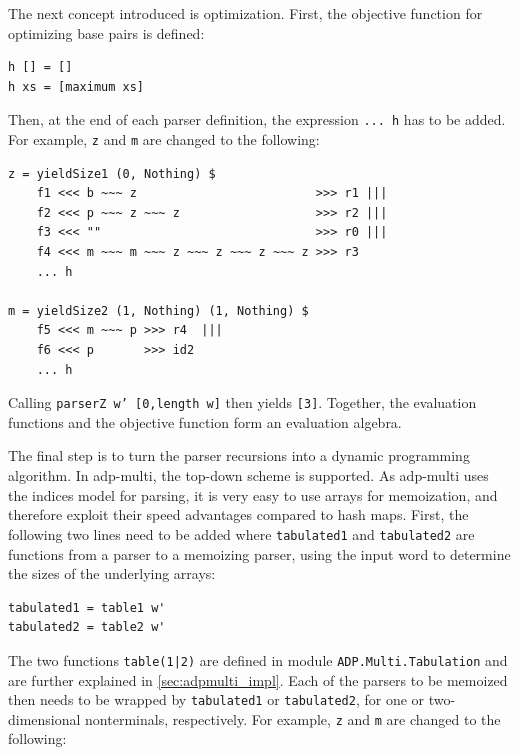 \documentclass[
    a4paper,
    12pt,
    twoside,
    BCOR=12mm,
    parskip=half,
    chapterprefix,
    numbers=noenddot,
    bibliography=totoc
]{scrbook}
\begin{document}
The next concept introduced is optimization. First, the objective function for optimizing base pairs is defined:

\begin{lstlisting}[caption=Objective function for maximizing base pairs]
h [] = []
h xs = [maximum xs]
\end{lstlisting}

Then, at the end of each parser definition, the expression \texttt{... h} has to be added. For example, \texttt{z} and \texttt{m} are changed to the following:

\begin{lstlisting}[caption=Application of objective function \texttt{h}]
z = yieldSize1 (0, Nothing) $
    f1 <<< b ~~~ z                         >>> r1 |||
    f2 <<< p ~~~ z ~~~ z                   >>> r2 |||
    f3 <<< ""                              >>> r0 |||
    f4 <<< m ~~~ m ~~~ z ~~~ z ~~~ z ~~~ z >>> r3
    ... h
		
m = yieldSize2 (1, Nothing) (1, Nothing) $
    f5 <<< m ~~~ p >>> r4  |||
    f6 <<< p       >>> id2
    ... h
\end{lstlisting}

Calling \texttt{parserZ w' [0,length w]} then yields \texttt{[3]}. Together, the evaluation functions and the objective function form an evaluation algebra.

The final step is to turn the parser recursions into a dynamic programming algorithm. In adp-multi, the top-down scheme is supported. As adp-multi uses the indices model for parsing, it is very easy to use arrays for memoization, and therefore exploit their speed advantages compared to hash maps. First, the following two lines need to be added where \verb|tabulated1| and \verb|tabulated2| are functions from a parser to a memoizing parser, using the input word to determine the sizes of the underlying arrays:

\begin{lstlisting}[caption=Wrapper functions for memoization]
tabulated1 = table1 w'
tabulated2 = table2 w'
\end{lstlisting}

The two functions \verb/table(1|2)/ are defined in module \verb|ADP.Multi.Tabulation| and are further explained in \cref{sec:adpmulti_impl}. Each of the parsers to be memoized then needs to be wrapped by \texttt{tabulated1} or \texttt{tabulated2}, for one or two-dimensional nonterminals, respectively. For example, \texttt{z} and \texttt{m} are changed to the following:
\end{document}
